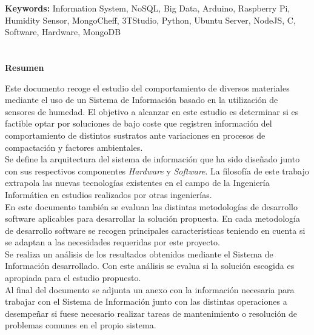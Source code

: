 
\newpage
\noindent
{\bf Keywords:\newline}
Information System, NoSQL, Big Data, Arduino, Raspberry Pi, Humidity Sensor, MongoCheff, 3TStudio, Python, Ubuntu Server, NodeJS, C, Software, Hardware, MongoDB

\thispagestyle{empty}
\newpage

\chapter*{}
\begin{center}
\textbf{Resumen}
\end{center}

Este documento recoge el estudio del comportamiento de diversos materiales mediante el uso de un Sistema de Información basado en la utilización de sensores de humedad. El objetivo a alcanzar en este estudio es determinar si es factible optar por soluciones de bajo coste que registren información del comportamiento de distintos sustratos ante variaciones en procesos de compactación y factores ambientales.\\

Se define la arquitectura del sistema de información que ha sido diseñado junto con sus respectivos componentes \textit{Hardware} y \textit{Software}. La filosofía de este trabajo extrapola las nuevas tecnologías existentes en el campo de la Ingeniería Informática en estudios realizados por otras ingenierías.\\

En este documento también se evaluan las distintas metodologías de desarrollo software aplicables para desarrollar la solución propuesta. En cada metodología de desarrollo software se recogen principales características teniendo en cuenta si se adaptan a las necesidades requeridas por este proyecto.\\

Se realiza un análisis de los resultados obtenidos mediante el Sistema de Información desarrollado. Con este análisis se evalua si la solución escogida es apropiada para el estudio propuesto.\\

Al final del documento se adjunta un anexo con la información necesaria para trabajar con el Sistema de Información junto con las distintas operaciones a desempeñar si fuese necesario realizar tareas de mantenimiento o resolución de problemas comunes en el propio sistema.


\thispagestyle{empty}

\newpage
